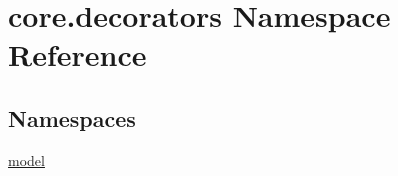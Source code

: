 \hypertarget{namespacecore_1_1decorators}{\section{core.\-decorators Namespace Reference}
\label{namespacecore_1_1decorators}
}
\subsection*{Namespaces}
\begin{DoxyCompactItemize}
\item 
\hyperlink{namespacecore_1_1decorators_1_1model}{model}
\end{DoxyCompactItemize}
